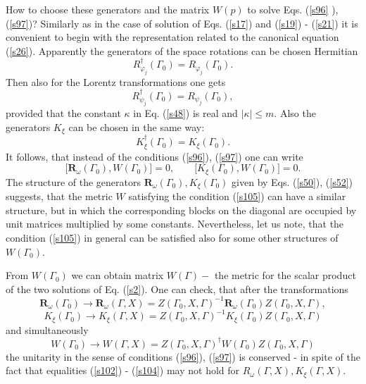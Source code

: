 \documentclass[a4paper,a4paper]{article}
\begin{document}
How to choose these generators and the matrix $W(p)$ to solve Eqs. (\ref{s96}%
), (\ref{s97})? Similarly as in the case of solution of Eqs. (\ref{s17}) and
(\ref{s19}) - (\ref{s21}) it is convenient to begin with the representation
related to the canonical equation (\ref{s26}). Apparently the generators of
the space rotations can be chosen Hermitian 
\begin{equation}
R_{\varphi _{j}}^{\dagger }(\Gamma _{0})=R_{\varphi _{j}}(\Gamma _{0}).
\label{s102}
\end{equation}%
Then also for the Lorentz transformations one gets 
\begin{equation}
R_{\psi _{j}}^{\dagger }(\Gamma _{0})=R_{\psi _{j}}(\Gamma _{0}),
\label{s103}
\end{equation}%
provided that the constant $\kappa $ in Eq. (\ref{s48}) is real and $\left|
\kappa \right| \leq m$. Also the generators $K_{\xi }$ can be chosen in the
same way: 
\begin{equation}
K_{\xi }^{\dagger }(\Gamma _{0})=K_{\xi }(\Gamma _{0}).  \label{s104}
\end{equation}%
It follows, that instead of the conditions (\ref{s96}), (\ref{s97}) one can
write 
\begin{equation}
\lbrack \mathbf{R}_{\omega }(\Gamma _{0}),W(\Gamma _{0})]=0,\qquad \lbrack
K_{\xi }(\Gamma _{0}),W(\Gamma _{0})]=0.  \label{s105}
\end{equation}%
The structure of the generators $\mathbf{R}_{\omega }(\Gamma _{0}),K_{\xi
}(\Gamma _{0})$ given by Eqs. (\ref{s50}), (\ref{s52}) suggests, that the
metric $W$ satisfying the condition (\ref{s105}) can have a similar
structure, but in which the corresponding blocks on the diagonal are
occupied by unit matrices multiplied by some constants. Nevertheless, let us
note, that the condition (\ref{s105}) in general can be satisfied also for
some other structures of $W(\Gamma _{0})$.

From $W(\Gamma _{0})$ we can obtain matrix $W(\Gamma )-$ the metric for the
scalar product of the two solutions of Eq. (\ref{s2}). One can check, that
after the transformations 
\begin{equation}
\mathbf{R}_{\omega }(\Gamma _{0})\rightarrow \mathbf{R}_{\omega }(\Gamma
,X)=Z(\Gamma _{0},X,\Gamma )^{-1}\mathbf{R}_{\omega }(\Gamma _{0})Z(\Gamma
_{0},X,\Gamma ),  \label{s106}
\end{equation}%
\begin{equation}
K_{\xi }(\Gamma _{0})\rightarrow K_{\xi }(\Gamma ,X)=Z(\Gamma _{0},X,\Gamma
)^{-1}K_{\xi }(\Gamma _{0})Z(\Gamma _{0},X,\Gamma )  \label{s107}
\end{equation}%
and simultaneously 
\begin{equation}
W(\Gamma _{0})\rightarrow W(\Gamma ,X)=Z(\Gamma _{0},X,\Gamma )^{\dagger
}W(\Gamma _{0})Z(\Gamma _{0},X,\Gamma )  \label{s108}
\end{equation}%
the unitarity in the sense of conditions (\ref{s96}), (\ref{s97}) is
conserved - in spite of the fact that equalities (\ref{s102}) - (\ref{s104})
may not hold for $R_{\omega }(\Gamma ,X),K_{\xi }(\Gamma ,X)$.
\end{document}
